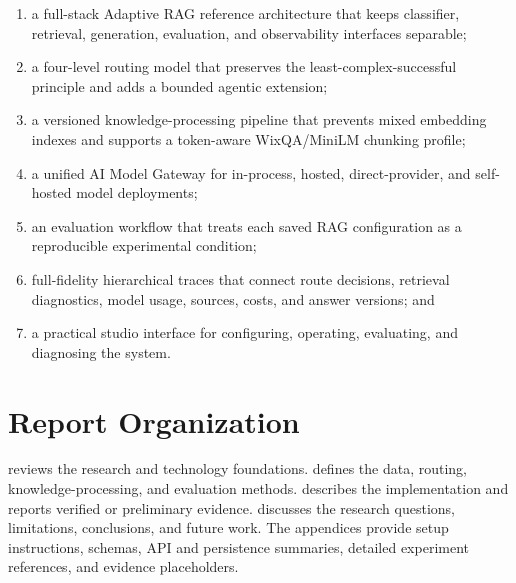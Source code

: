 \begin{enumerate}
  \item a full-stack Adaptive RAG reference architecture that keeps classifier,
  retrieval, generation, evaluation, and observability interfaces separable;
  \item a four-level routing model that preserves the least-complex-successful
  principle and adds a bounded agentic extension;
  \item a versioned knowledge-processing pipeline that prevents mixed embedding
  indexes and supports a token-aware WixQA/MiniLM chunking profile;
  \item a unified AI Model Gateway for in-process, hosted, direct-provider, and
  self-hosted model deployments;
  \item an evaluation workflow that treats each saved RAG configuration as a
  reproducible experimental condition;
  \item full-fidelity hierarchical traces that connect route decisions,
  retrieval diagnostics, model usage, sources, costs, and answer versions; and
  \item a practical studio interface for configuring, operating, evaluating,
  and diagnosing the system.
\end{enumerate}

\section{Report Organization}

 reviews the research and technology foundations.
 defines the data, routing, knowledge-processing, and
evaluation methods.  describes the
implementation and reports verified or preliminary evidence.
 discusses the research questions, limitations,
conclusions, and future work. The appendices provide setup instructions,
schemas, API and persistence summaries, detailed experiment references, and
evidence placeholders.
